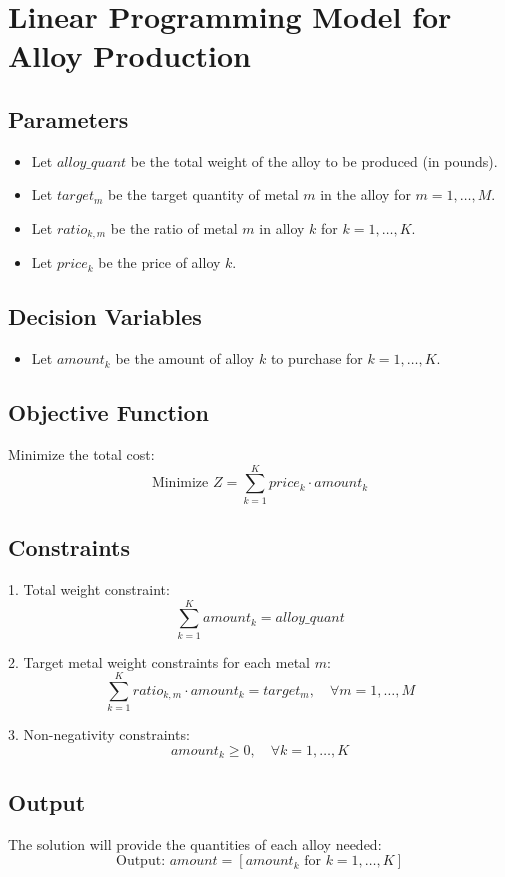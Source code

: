 \documentclass{article}
\begin{document}
\section*{Linear Programming Model for Alloy Production}

\subsection*{Parameters}
\begin{itemize}
    \item Let \( alloy\_quant \) be the total weight of the alloy to be produced (in pounds).
    \item Let \( target_{m} \) be the target quantity of metal \( m \) in the alloy for \( m = 1, \ldots, M \).
    \item Let \( ratio_{k, m} \) be the ratio of metal \( m \) in alloy \( k \) for \( k = 1, \ldots, K \).
    \item Let \( price_{k} \) be the price of alloy \( k \).
\end{itemize}

\subsection*{Decision Variables}
\begin{itemize}
    \item Let \( amount_{k} \) be the amount of alloy \( k \) to purchase for \( k = 1, \ldots, K \).
\end{itemize}

\subsection*{Objective Function}
Minimize the total cost:
\[
\text{Minimize } Z = \sum_{k=1}^{K} price_{k} \cdot amount_{k}
\]

\subsection*{Constraints}
1. Total weight constraint:
\[
\sum_{k=1}^{K} amount_{k} = alloy\_quant
\]

2. Target metal weight constraints for each metal \( m \):
\[
\sum_{k=1}^{K} ratio_{k, m} \cdot amount_{k} = target_{m}, \quad \forall m = 1, \ldots, M
\]

3. Non-negativity constraints:
\[
amount_{k} \geq 0, \quad \forall k = 1, \ldots, K
\]

\subsection*{Output}
The solution will provide the quantities of each alloy needed:
\[
\text{Output: } amount = [amount_{k} \text{ for } k = 1,\ldots,K]
\]
\end{document}
